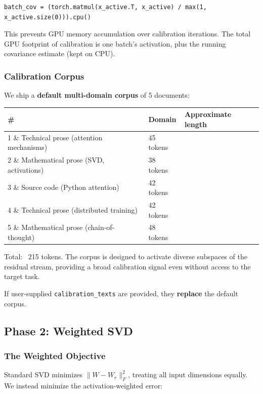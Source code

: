 \begin{lstlisting}
batch_cov = (torch.matmul(x_active.T, x_active) / max(1, x_active.size(0))).cpu()
\end{lstlisting}

This prevents GPU memory accumulation over calibration iterations. The total 
GPU footprint of calibration is one batch's activation, plus the running 
covariance estimate (kept on CPU).

\subsubsection{Calibration Corpus}

We ship a \textbf{default multi-domain corpus} of 5 documents:

\begin{table}[H]
\centering
\small
\begin{tabular}{lll}
\toprule
\textbf{\#} & \textbf{Domain} & \textbf{Approximate length} \\
\midrule
1 \& Technical prose (attention mechanisms) & 45 tokens \\
2 \& Mathematical prose (SVD, activations) & 38 tokens \\
3 \& Source code (Python attention) & 42 tokens \\
4 \& Technical prose (distributed training) & 42 tokens \\
5 \& Mathematical prose (chain-of-thought) & 48 tokens \\
\bottomrule
\end{tabular}
\end{table}

Total: ~215 tokens. The corpus is designed to activate diverse subspaces 
of the residual stream, providing a broad calibration signal even without 
access to the target task.

If user-supplied \texttt{calibration\_texts} are provided, they \textbf{replace} the 
default corpus.

\subsection{Phase 2: Weighted SVD}

\subsubsection{The Weighted Objective}

Standard SVD minimizes $\|W - W_r\|_F^2$, treating all input dimensions 
equally. We instead minimize the activation-weighted error:

